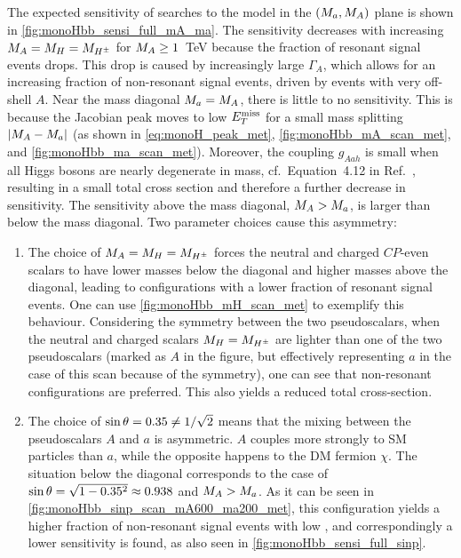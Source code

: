 The expected sensitivity of \monohbb searches to the \hdma model in the $(M_{a},M_{A})$ plane is shown in \autoref{fig:monoHbb_sensi_full_mA_ma}.
The sensitivity decreases with increasing $M_{A} = M_{H} = M_{H^{\pm}}$ for $M_{A} \geq 1$~TeV because the fraction of resonant signal events drops. 
This drop is caused by increasingly large $\Gamma_A$, which allows for an increasing fraction of non-resonant signal events, driven by events with very off-shell $A$. 
Near the mass diagonal $M_{a} = M_{A}$, there is little to no sensitivity. 
This is because the Jacobian peak moves to low $E_T^\mathrm{miss}$ for a small mass splitting $|M_{A} - M_{a}|$  (as shown in \autoref{eq:monoH_peak_met}, \autoref{fig:monoHbb_mA_scan_met}, and \autoref{fig:monoHbb_ma_scan_met}). 
Moreover, the coupling $g_{Aah}$ is small when all Higgs bosons are nearly degenerate in mass, cf.~Equation~4.12 in Ref.~\cite{Bauer:2017ota}, %
resulting in a small total cross section and therefore a further decrease in sensitivity.
The sensitivity above the mass diagonal, $M_{A} > M_{a}$, is larger than below the mass diagonal.
Two parameter choices cause this asymmetry:
\begin{enumerate}
\item 
The choice of $M_{A} = M_{H} = M_{H^{\pm}}$ forces the neutral and charged $CP$-even scalars to have lower masses below the diagonal and higher masses above the diagonal, leading to configurations with a lower fraction of resonant signal events. One can use \autoref{fig:monoHbb_mH_scan_met} to exemplify this behaviour. Considering the symmetry between the two pseudoscalars, when the neutral and charged scalars $M_{H} = M_{H^{\pm}}$ are lighter than one of the two pseudoscalars (marked as $A$ in the figure, but effectively representing $a$ in the case of this scan because of the symmetry), one can see that non-resonant configurations are preferred. This also yields a reduced total cross-section. 
\item 
The choice of $\sin\theta = 0.35 \neq 1/\sqrt{2}$ means that the mixing between the pseudoscalars $A$ and $a$ is asymmetric. 
$A$ couples more strongly to SM particles than $a$, while the opposite happens to the DM fermion $\chi$.
The situation below the diagonal corresponds to the case of $\sin\theta = \sqrt{1-0.35^2} \approx 0.938$ and $M_{A} > M_{a}$. 
As it can be seen in \autoref{fig:monoHbb_sinp_scan_mA600_ma200_met}, this \sinp configuration yields a higher fraction of non-resonant signal events with low \met, and correspondingly a lower sensitivity is found, as also seen in \autoref{fig:monoHbb_sensi_full_sinp}.
\end{enumerate}


